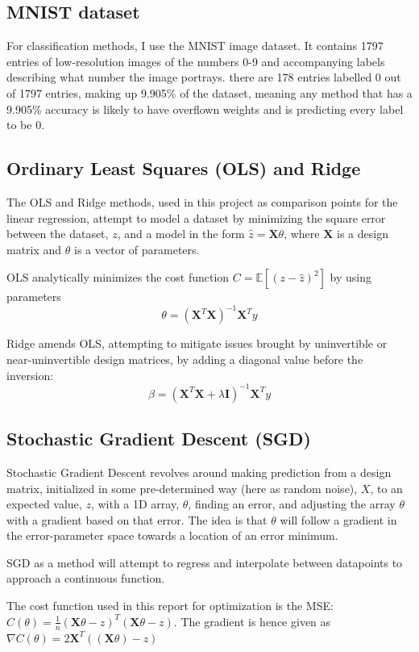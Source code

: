 \documentclass[a4paper, UKenglish]{article}
\newcommand{\0}{\mathbf{0}}
\newcommand{\1}{\mathbf{1}}
\begin{document}
\subsection{MNIST dataset} \label{sec:MNIST}
For classification methods, I use the MNIST image dataset. It contains 1797 entries of low-resolution images of the numbers 0-9 and accompanying labels describing what number the image portrays. there are 178 entries labelled 0 out of 1797 entries, making up 9.905\% of the dataset, meaning any method that has a 9.905\% accuracy is likely to have overflown weights and is predicting every label to be 0.

\subsection{Ordinary Least Squares (OLS) and Ridge}
The OLS and Ridge methods, used in this project as comparison points for the linear regression, attempt to model a dataset by minimizing the square error between the dataset, $z$, and a model in the form $\hat{z} = \textbf{X}\theta$, where $\textbf{X}$ is a design matrix and $\theta$ is a vector of parameters.

OLS analytically minimizes the cost function $C = \mathbb{E}[(z - \hat{z})^2]$ by using parameters $$\theta = \left(\textbf{X}^T\textbf{X}\right)^{-1} \textbf{X}^T y $$

Ridge amends OLS, attempting to mitigate issues brought by uninvertible or near-uninvertible design matrices, by adding a diagonal value before the inversion: $$\beta = \left(\textbf{X}^T\textbf{X} + \lambda \textbf{I}\right)^{-1} \textbf{X}^T y $$
\subsection{Stochastic Gradient Descent (SGD)}
Stochastic Gradient Descent revolves around making prediction from a design matrix, initialized in some pre-determined way (here as random noise), $X$, to an expected value, $z$, with a 1D array, $\theta$, finding an error, and adjusting the array $\theta$ with a gradient based on that error. The idea is that $\theta$ will follow a gradient in the error-parameter space towards a location of an error minimum.

SGD as a method will attempt to regress and interpolate between datapoints to approach a continuous function.

The cost function used in this report for optimization is the MSE: $C(\theta) = \frac{1}{n}(\textbf{X}\theta - z)^T(\textbf{X}\theta - z)$. The gradient is hence given as $\nabla C(\theta) = 2\textbf{X}^T((\textbf{X}\theta) - z)$
\end{document}
